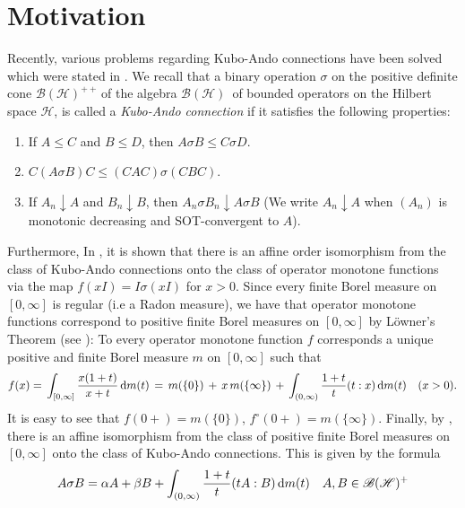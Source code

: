 \documentclass[12pt,a4paper]{amsart}
\theoremstyle{definition}
\newcommand{\mybh}{$\mathscr{B}(\mathscr{H})$}
\newcommand{\mybhplusplus}{$\mathscr{B}(\mathscr{H})^{++}$}
\begin{document}
	\section{Motivation}
	Recently, various problems regarding Kubo-Ando connections have been solved which were stated in \cite[Page 22]{molnar-main}.  We recall that a binary operation $\sigma$ on the positive definite cone \mybhplusplus\,of the algebra \mybh\, of bounded operators on the Hilbert space $\mathscr{H}$,  is called a \emph{Kubo-Ando connection} if it satisfies the following properties:
	\begin{enumerate}[label=\textnormal{(\Roman*)}]
		\item If $A \leq C$ and $B \leq D$, then $ A \sigma B \leq C \sigma D $.
		\item $ C (A \sigma B) C \leq (CAC) \sigma (CBC) $.
		\item  If $ A_n  \downarrow A$ and $ B_n \downarrow B $, then $ A_n \sigma B_n \downarrow A \sigma B$ (We write $A_n\downarrow A$ when $(A_n)$ is monotonic decreasing and SOT-convergent to $A$).
	\end{enumerate}
	Furthermore, 	 In \cite[Theorem  3.2]{kubo-ando-main}, it is shown that there is an affine order isomorphism from the class of Kubo-Ando connections onto the class of operator monotone functions via the map $f(xI) = I \sigma (xI)$ for $x>0$. 	Since every finite Borel measure on $[0, \infty]$ is regular (i.e a Radon measure), we have that operator monotone functions correspond to positive finite Borel measures on $[0,\infty]$ by L\"owner's Theorem (see \cite{donoghue}): To every  operator monotone function $f$ corresponds a unique positive and finite Borel measure $m$ on $[0,\infty]$ such that
	\begin{equation}\label{e4}
		f(x)=\,\int_{[0,\infty]}\frac{x(1+t)}{x+t}\,{\rm d}m(t)\,=\,m(\{0\})\,+\,x\,m(\{\infty\})\,+\,\int_{(0,\infty)}\frac{1+t}{t}(t:x)\,{\rm d}m(t)\quad(x>0).
	\end{equation}
	It is easy to see that $f(0+)=m(\{0\})$, $f^\circ(0+)=m(\{\infty\})$.
	Finally, by \cite[Theorem 3.4]{kubo-ando-main}, there is an affine isomorphism from the class of positive finite Borel measures on $[0,\infty]$ onto the class of Kubo-Ando connections. This is given by the formula
	\begin{equation}\label{kubo-ando-integral-representation}
		A \sigma B = \alpha A +  \beta B + \int_{(0, \infty)} \frac{1+t}{t} (tA:B) \, {\rm d} m(t) \quad A, B \in  \mathscr B(\mathscr{H})^{+}
	\end{equation}
\end{document}

